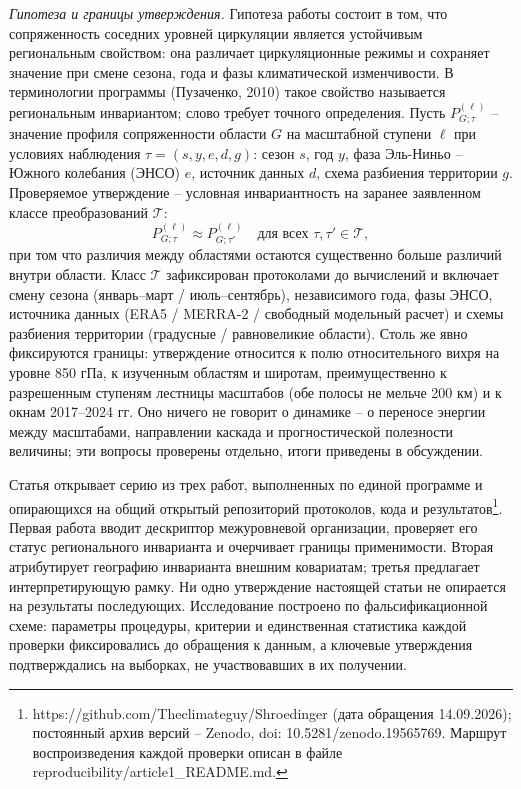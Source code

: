 \documentclass[12pt,a4paper]{article}
\begin{document}
\emph{Гипотеза и границы утверждения.} Гипотеза работы состоит в том, что сопряженность соседних уровней циркуляции является устойчивым региональным свойством: она различает циркуляционные режимы и сохраняет значение при смене сезона, года и фазы климатической изменчивости. В терминологии программы (Пузаченко, 2010) такое свойство называется региональным инвариантом; слово требует точного определения. Пусть $P^{(\ell)}_{G;\tau}$ -- значение профиля сопряженности области $G$ на масштабной ступени $\ell$ при условиях наблюдения $\tau = (s, y, e, d, g)$: сезон $s$, год $y$, фаза Эль-Ниньо -- Южного колебания (ЭНСО) $e$, источник данных $d$, схема разбиения территории $g$. Проверяемое утверждение -- условная инвариантность на заранее заявленном классе преобразований $\mathcal{T}$:
\begin{equation}
\label{eq:inv}
P^{(\ell)}_{G;\tau} \approx P^{(\ell)}_{G;\tau'} \quad \text{для всех } \tau, \tau' \in \mathcal{T},
\end{equation}
при том что различия между областями остаются существенно больше различий внутри области. Класс $\mathcal{T}$ зафиксирован протоколами до вычислений и включает смену сезона (январь--март / июль--сентябрь), независимого года, фазы ЭНСО, источника данных (ERA5 / MERRA-2 / свободный модельный расчет) и схемы разбиения территории (градусные / равновеликие области). Столь же явно фиксируются границы: утверждение относится к полю относительного вихря на уровне 850 гПа, к изученным областям и широтам, преимущественно к разрешенным ступеням лестницы масштабов (обе полосы не мельче 200 км) и к окнам 2017--2024 гг. Оно ничего не говорит о динамике -- о переносе энергии между масштабами, направлении каскада и прогностической полезности величины; эти вопросы проверены отдельно, итоги приведены в обсуждении.

Статья открывает серию из трех работ, выполненных по единой программе и опирающихся на общий открытый репозиторий протоколов, кода и результатов\footnote{https://github.com/Theclimateguy/Shroedinger (дата обращения 14.09.2026); постоянный архив версий -- Zenodo, doi: 10.5281/zenodo.19565769. Маршрут воспроизведения каждой проверки описан в файле reproducibility/article1\_README.md.}. Первая работа вводит дескриптор межуровневой организации, проверяет его статус регионального инварианта и очерчивает границы применимости. Вторая атрибутирует географию инварианта внешним ковариатам; третья предлагает интерпретирующую рамку. Ни одно утверждение настоящей статьи не опирается на результаты последующих. Исследование построено по фальсификационной схеме: параметры процедуры, критерии и единственная статистика каждой проверки фиксировались до обращения к данным, а ключевые утверждения подтверждались на выборках, не участвовавших в их получении.
\end{document}
